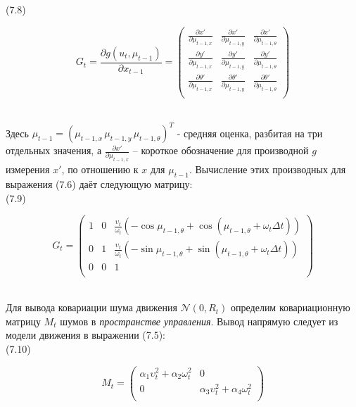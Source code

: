 \documentclass[10pt,a4paper]{article}
\begin{document}
(7.8)
\begin{minipage}{0.2\textwidth}
	\begin{equation*}
	G_t=\frac{\partial g(u_t,\mu_{t-1})}{\partial x_{t-1}}=
	\left(\begin{array}{ccc}
	\frac{\partial x'}{\partial \mu_{t-1,x}}&\frac{\partial x'}{\partial \mu_{t-1,y}}&\frac{\partial x'}{\partial \mu_{t-1,\theta}}\\
	\frac{\partial y'}{\partial \mu_{t-1,x}}&\frac{\partial y'}{\partial \mu_{t-1,y}}&\frac{\partial y'}{\partial \mu_{t-1,\theta}}\\
	\frac{\partial \theta'}{\partial \mu_{t-1,x}}&\frac{\partial \theta'}{\partial \mu_{t-1,y}}&\frac{\partial \theta'}{\partial \mu_{t-1,\theta}}\\
	\end{array}\right)
	\end{equation*}
\end{minipage}\\

Здесь $\mu_{t-1} = (\mu_{t-1,x}\, \mu_{t-1,y}\, \mu_{t-1,\theta})^T$ - средняя оценка, разбитая на три отдельных значения, а $\frac{\partial x'}{\partial\mu_{t-1,x}}$ – короткое обозначение для производной $g$ измерения $x'$, по отношению к $x$ для $\mu_{t-1}$. Вычисление этих производных для выражения (7.6) даёт следующую матрицу:\\

(7.9)
\begin{minipage}{0.2\textwidth}
	\begin{equation*}
	G_t=
	\left(\begin{array}{ccc}
	1&0&\frac{\upsilon_t}{\omega_t}(-\cos\mu_{t-1,\theta}+\cos(\mu_{t-1,\theta}+\omega_t\varDelta t))\\
	0&1&\frac{\upsilon_t}{\omega_t}(-\sin\mu_{t-1,\theta}+\sin(\mu_{t-1,\theta}+\omega_t\varDelta t))\\
	0&0&1\\
	\end{array}\right)
	\end{equation*}
\end{minipage}\\

Для вывода ковариации шума движения $\mathcal{N} (0, R_t)$ определим ковариационную матрицу $M_t$ шумов в \textit{пространстве управления}. Вывод напрямую следует из модели движения в выражении (7.5):\\

(7.10)
\begin{minipage}{0.2\textwidth}
	\begin{equation*}
	M_t=
	\left(\begin{array}{cc}
	\alpha_1\upsilon_t^2+\alpha_2\omega_t^2&0\\
	0&\alpha_3\upsilon_t^2+\alpha_4\omega_t^2\\
	\end{array}\right)
	\end{equation*}
\end{minipage}\\
\end{document}
